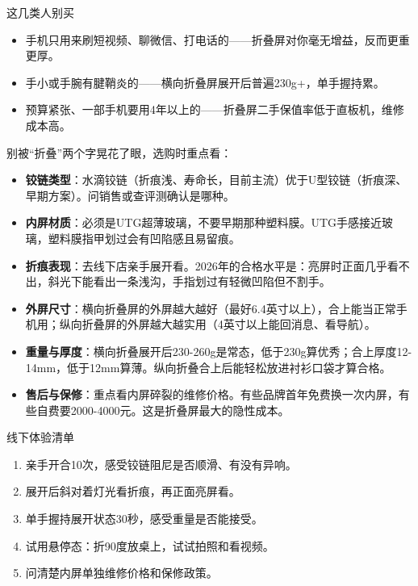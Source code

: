 \begin{tcbwarn}{这几类人别买}
\begin{itemize}
  \item 手机只用来刷短视频、聊微信、打电话的——折叠屏对你毫无增益，反而更重更厚。
  \item 手小或手腕有腱鞘炎的——横向折叠屏展开后普遍230g+，单手握持累。
  \item 预算紧张、一部手机要用4年以上的——折叠屏二手保值率低于直板机，维修成本高。
\end{itemize}

\end{tcbwarn}


别被“折叠”两个字晃花了眼，选购时重点看：

\begin{itemize}
  \item \textbf{铰链类型}：水滴铰链（折痕浅、寿命长，目前主流）优于U型铰链（折痕深、早期方案）。问销售或查评测确认是哪种。
  \item \textbf{内屏材质}：必须是UTG超薄玻璃，不要早期那种塑料膜。UTG手感接近玻璃，塑料膜指甲划过会有凹陷感且易留痕。
  \item \textbf{折痕表现}：去线下店亲手展开看。2026年的合格水平是：亮屏时正面几乎看不出，斜光下能看出一条浅沟，手指划过有轻微凹陷但不割手。
  \item \textbf{外屏尺寸}：横向折叠屏的外屏越大越好（最好6.4英寸以上），合上能当正常手机用；纵向折叠屏的外屏越大越实用（4英寸以上能回消息、看导航）。
  \item \textbf{重量与厚度}：横向折叠展开后230-260g是常态，低于230g算优秀；合上厚度12-14mm，低于12mm算薄。纵向折叠合上后能轻松放进衬衫口袋才算合格。
  \item \textbf{售后与保修}：重点看内屏碎裂的维修价格。有些品牌首年免费换一次内屏，有些自费要2000-4000元。这是折叠屏最大的隐性成本。
\end{itemize}

\begin{tcbpractice}{线下体验清单}
\begin{enumerate}
  \item 亲手开合10次，感受铰链阻尼是否顺滑、有没有异响。
  \item 展开后斜对着灯光看折痕，再正面亮屏看。
  \item 单手握持展开状态30秒，感受重量是否能接受。
  \item 试用悬停态：折90度放桌上，试试拍照和看视频。
  \item 问清楚内屏单独维修价格和保修政策。
\end{enumerate}

\end{tcbpractice}

